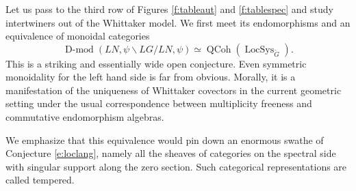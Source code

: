 \documentclass[10pt]{amsart}
\newcommand{\LS}{\on{LocSys}_{\cG}}
\newcommand{\on}{\operatorname}
\newcommand{\Dmod}{\on{D-mod}}
\theoremstyle{remark}
\numberwithin{equation}{section}
\newcommand{\cG}{\check{G}}
\newcommand{\QCoh}{\on{QCoh}}
\begin{document}
\subsubsection{} Let us pass to the third row of Figures \ref{f:tableaut} and \ref{f:tablespec} and study 
intertwiners out of the Whittaker model. We first meet its endomorphisms and 
an equivalence of monoidal categories
%
\begin{equation} \label{e:whitend} \Dmod(LN, \psi \backslash LG / LN, \psi)  
\simeq \QCoh(\LS).\end{equation}
%
This is a striking and essentially wide open conjecture. Even  symmetric 
monoidality for the left hand side is far from obvious. Morally, it is a 
manifestation of the uniqueness of Whittaker covectors in the current geometric 
setting under the usual correspondence between multiplicity freeness and 
commutative endomorphism algebras.


We emphasize that this equivalence would pin down an enormous swathe of 
Conjecture \eqref{e:loclang}, namely all the sheaves of categories on the 
spectral side with singular support along the zero section. Such categorical 
representations are called tempered.  
\end{document}
